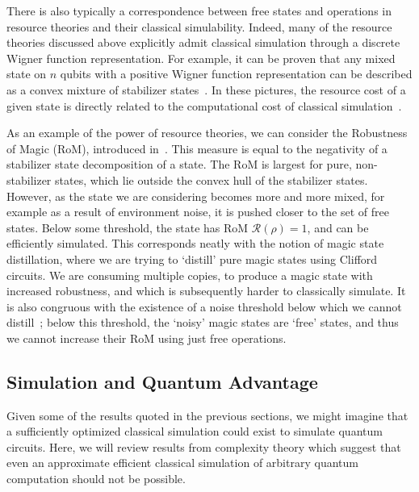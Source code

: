There is also typically a correspondence between free states and operations in resource theories and their classical simulability. Indeed, many of the resource theories discussed above explicitly admit classical simulation through a discrete Wigner function representation. For example, it can be proven that any mixed state on $n$ qubits with a positive Wigner function representation can be described as a convex mixture of stabilizer states~\cite{Gross2006}. In these pictures, the resource cost of a given state is directly related to the computational cost of classical simulation~\cite{Howard2017,Kocia2017,Seddon2019,Raussendorf2019}.\par
As an example of the power of resource theories, we can consider the Robustness of Magic (RoM), introduced in~\cite{Howard2017}. This measure is equal to the negativity of a stabilizer state decomposition of a state. The RoM is largest for pure, non-stabilizer states, which lie outside the convex hull of the stabilizer states. However, as the state we are considering becomes more and more mixed, for example as a result of environment noise, it is pushed closer to the set of free states. Below some threshold, the state has RoM $\mathcal{R}\left(\rho\right)=1$, and can be efficiently simulated. This corresponds neatly with the notion of magic state distillation, where we are trying to `distill' pure magic states using Clifford circuits. We are consuming multiple copies, to produce a magic state with increased robustness, and which is subsequently harder to classically simulate. It is also congruous with the existence of a noise threshold below which we cannot distill~\cite{Bravyi2005}; below this threshold, the `noisy' magic states are `free' states, and thus we cannot increase their RoM using just free operations.
\subsection{Simulation and Quantum Advantage}\label{sec:intro_complexity}
Given some of the results quoted in the previous sections, we might imagine that a sufficiently optimized classical simulation could exist to simulate quantum circuits. Here, we will review results from complexity theory which suggest that even an approximate efficient classical simulation of arbitrary quantum computation should not be possible.\par
